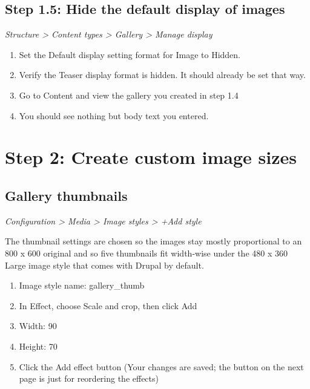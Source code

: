 \documentclass[letterpaper,10pt,english]{sphinxmanual}
\begin{document}
\subsection{Step 1.5: Hide the default display of images}
\label{recipe:step-1-5-hide-the-default-display-of-images}
\emph{Structure \textgreater{} Content types \textgreater{} Gallery \textgreater{} Manage display}
\begin{enumerate}
\item {} 
Set the Default display setting format for Image to Hidden.

\item {} 
Verify the Teaser display format is hidden. It should already be set that way.

\item {} 
Go to Content and view the gallery you created in step 1.4

\item {} 
You should see nothing but body text you entered.

\end{enumerate}


\section{Step 2: Create custom image sizes}
\label{recipe:step-2-create-custom-image-sizes}

\subsection{Gallery thumbnails}
\label{recipe:gallery-thumbnails}
\emph{Configuration \textgreater{} Media \textgreater{} Image styles \textgreater{} +Add style}

The thumbnail settings are chosen so the images stay mostly proportional to an 800 x 600 original and so five thumbnails fit width-wise under the 480 x 360 Large image style that comes with Drupal by default.
\begin{enumerate}
\item {} 
Image style name: gallery\_thumb

\item {} 
In Effect, choose Scale and crop, then click Add

\item {} 
Width: 90

\item {} 
Height: 70

\item {} 
Click the Add effect button (Your changes are saved; the button on the next page is just for reordering the effects)

\end{enumerate}
\end{document}
